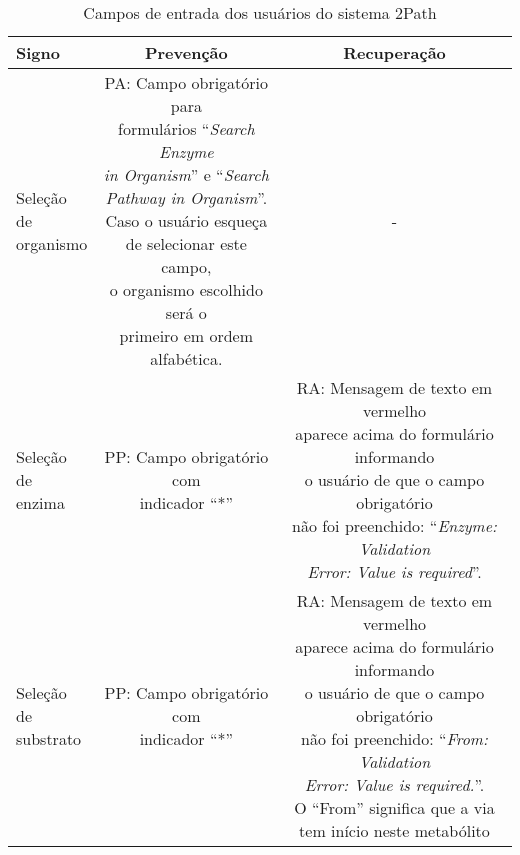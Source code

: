 \indent 
\begin{table}
\centering
\caption{Campos de entrada dos usuários do sistema 2Path} \label{prevencaoRecuperacao:2Path}
\begin{tabular}{|l|c|c|}
\hline
{\cellcolor[HTML]{DFDFDF}\textbf{Signo}} &  {\cellcolor[HTML]{DFDFDF}\textbf{Prevenção}} &  {\cellcolor[HTML]{DFDFDF}\textbf{Recuperação}}\\ \hline
\specialcell{Seleção de\\organismo}  & \specialcell{PA: Campo obrigatório para\\ formulários ``\textit{Search Enzyme}\\\textit{in Organism}'' e  ``\textit{Search}\\\textit{Pathway in Organism}''.\\Caso o usuário esqueça\\de selecionar este campo,\\o organismo escolhido será o\\primeiro em ordem alfabética.} & -  \\ \hline

\specialcell{Seleção de\\enzima} & \specialcell{PP: Campo obrigatório com\\indicador ``*''} & \specialcell{RA: Mensagem de texto em vermelho \\aparece acima do formulário informando\\o usuário de que o campo obrigatório\\não foi preenchido: ``\textit{Enzyme: Validation}\\\textit{ Error: Value is required}''.} \\ \hline

\specialcell{Seleção de\\substrato} & \specialcell{PP: Campo obrigatório com\\indicador ``*''} & \specialcell{RA: Mensagem de texto em vermelho \\aparece acima do formulário informando\\o usuário de que o campo obrigatório\\não foi preenchido: ``\textit{From: Validation}\\\textit{Error: Value is required.}''.\\O ``From'' significa que a via\\tem início neste metabólito} \\ \hline


\end{tabular}
\end{table}
